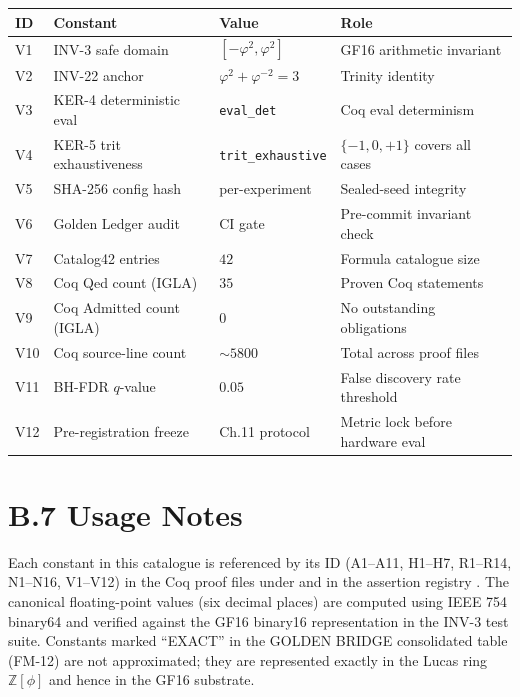 \begin{longtable}[]{@{}llll@{}}
\toprule\noalign{}
ID & Constant & Value & Role \\
\midrule\noalign{}
\endhead
\bottomrule\noalign{}
\endlastfoot
V1 & INV-3 safe domain & $[-\varphi^2, \varphi^2]$ & GF16 arithmetic invariant \\
V2 & INV-22 anchor & $\varphi^2 + \varphi^{-2} = 3$ & Trinity identity \\
V3 & KER-4 deterministic eval & \texttt{eval\_det} & Coq eval determinism \\
V4 & KER-5 trit exhaustiveness & \texttt{trit\_exhaustive} & $\{-1,0,+1\}$ covers all cases \\
V5 & SHA-256 config hash & per-experiment & Sealed-seed integrity \\
V6 & Golden Ledger audit & CI gate & Pre-commit invariant check \\
V7 & Catalog42 entries & $42$ & Formula catalogue size \\
V8 & Coq Qed count (IGLA) & $35$ & Proven Coq statements \\
V9 & Coq Admitted count (IGLA) & $0$ & No outstanding obligations \\
V10 & Coq source-line count & $\sim 5800$ & Total across proof files \\
V11 & BH-FDR $q$-value & $0.05$ & False discovery rate threshold \\
V12 & Pre-registration freeze & Ch.11 protocol & Metric lock before hardware eval \\
\end{longtable}

\section*{B.7 Usage Notes}
\label{app:B-usage}

Each constant in this catalogue is referenced by its ID (A1--A11,
H1--H7, R1--R14, N1--N16, V1--V12) in the Coq proof files under
 and in the assertion registry
. The canonical floating-point
values (six decimal places) are computed using IEEE 754 binary64 and
verified against the GF16 binary16 representation in the INV-3 test
suite. Constants marked ``EXACT'' in the GOLDEN BRIDGE consolidated
table (FM-12) are not approximated; they are represented exactly in
the Lucas ring $\mathbb{Z}[\phi]$ and hence in the GF16 substrate.
